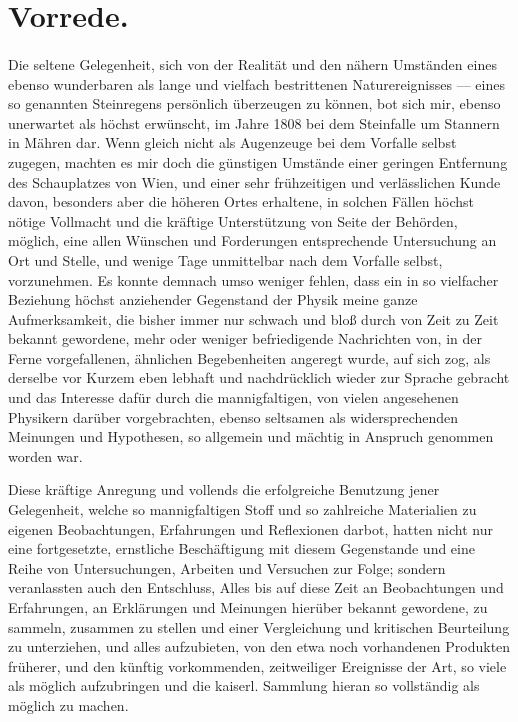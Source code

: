 \documentclass[a4paper, 11pt, oneside, german]{article}
\begin{document}
\section*{Vorrede.}
\paragraph{}
Die seltene Gelegenheit, sich von der Realität und den nähern Umständen eines ebenso wunderbaren als lange und vielfach bestrittenen Naturereignisses --- eines so genannten Steinregens persönlich überzeugen zu können, bot sich mir, ebenso unerwartet als höchst erwünscht, im Jahre 1808 bei dem Steinfalle um Stannern in Mähren dar. Wenn gleich nicht als Augenzeuge bei dem Vorfalle selbst zugegen, machten es mir doch die günstigen Umstände einer geringen Entfernung des Schauplatzes von Wien, und einer sehr frühzeitigen und verlässlichen Kunde davon, besonders aber die höheren Ortes erhaltene, in solchen Fällen höchst nötige Vollmacht und die kräftige Unterstützung von Seite der Behörden, möglich, eine allen Wünschen und Forderungen entsprechende Untersuchung an Ort und Stelle, und wenige Tage unmittelbar nach dem Vorfalle selbst, vorzunehmen. Es konnte demnach umso weniger fehlen, dass ein in so vielfacher Beziehung höchst anziehender Gegenstand der Physik meine ganze Aufmerksamkeit, die bisher immer nur schwach und bloß durch von Zeit zu Zeit bekannt gewordene, mehr oder weniger befriedigende Nachrichten von, in der Ferne vorgefallenen, ähnlichen Begebenheiten angeregt wurde, auf sich zog, als derselbe vor Kurzem eben lebhaft und nachdrücklich wieder zur Sprache gebracht und das Interesse dafür durch die mannigfaltigen, von vielen angesehenen Physikern darüber vorgebrachten, ebenso seltsamen als widersprechenden Meinungen und Hypothesen, so allgemein und mächtig in Anspruch genommen worden war.

Diese kräftige Anregung und vollends die erfolgreiche Benutzung jener Gelegenheit, welche so mannigfaltigen Stoff und so zahlreiche Materialien zu eigenen Beobachtungen, Erfahrungen und Reflexionen darbot, hatten nicht nur eine fortgesetzte, ernstliche Beschäftigung mit diesem Gegenstande und eine Reihe von Untersuchungen, Arbeiten und Versuchen zur Folge; sondern veranlassten auch den Entschluss, Alles bis auf diese Zeit an Beobachtungen und Erfahrungen, an Erklärungen und Meinungen hierüber bekannt gewordene, zu sammeln, zusammen zu stellen und einer Vergleichung und kritischen Beurteilung zu unterziehen, und alles aufzubieten, von den etwa noch vorhandenen Produkten früherer, und den künftig vorkommenden, zeitweiliger Ereignisse der Art, so viele als möglich aufzubringen und die kaiserl. Sammlung hieran so vollständig als möglich zu machen.
\end{document}
